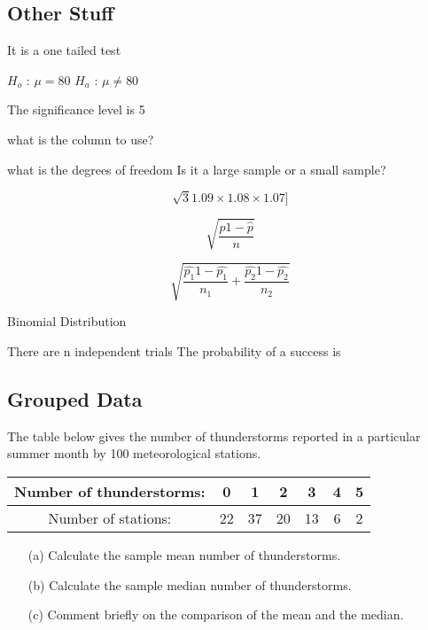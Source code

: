 \documentclass[]{report}
\begin{document}
\subsection{Other Stuff}

It is a one tailed test

$H_o$  : $\mu = 80 $
$H_a$  : $\mu \neq 80$ 

The significance level is 5%

what is the column to use?

what is the degrees of freedom 
Is it a large sample or a small sample?



\[\sqrt{3}{1.09 \times 1.08 \times 1.07}]\]


\[\sqrt{ \frac{\hat{p} 1- \hat{p}}{n} }\]


\[\sqrt{ \frac{\hat{p_1} 1- \hat{p_1}}{n_1} + \frac{\hat{p_2} 1- \hat{p_2}}{n_2}}\]



Binomial Distribution

There are n independent trials
The probability of a success is









\subsection{Grouped Data}

The table below gives the number of thunderstorms reported in a particular summer
month by 100 meteorological stations.

\begin{tabular}{|c|c|c|c|c|c|c|}
Number of thunderstorms: &0& 1 &2 &3 &4 &5 \\ \hline
Number of stations: & 22 & 37 & 20 & 13 & 6 & 2 \\ \hline
\end{tabular}

\begin{itemize}
\item[(a)] Calculate the sample mean number of thunderstorms.
\item[(b)] Calculate the sample median number of thunderstorms.
\item[(c)] Comment briefly on the comparison of the mean and the median.
\end{itemize}
\end{document}
